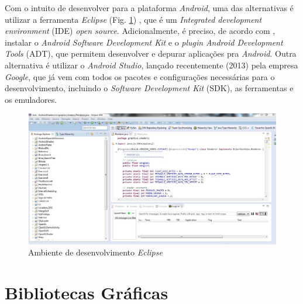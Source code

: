 	Com o intuito de desenvolver para a plataforma \textit{Android}, uma das alternativas é utilizar a ferramenta \textit{Eclipse} (Fig. \ref{eclipse}) , que é um \textit{Integrated development environment} (IDE) \textit{open source}. Adicionalmente, é preciso, de acordo com \cite{androidsdkmanager}, instalar o \textit{Android Software Development Kit} e o	\textit{plugin} \textit{Android Development Tools} (ADT), que permitem desenvolver e depurar aplicações pra \textit{Android}. Outra alternativa é utilizar o \textit{Android Studio}, lançado recentemente (2013) pela empresa \textit{Google}, que já vem com todos os pacotes e configurações necessárias para o desenvolvimento, incluindo o  \textit{Software Development Kit} (SDK), as ferramentas e os emuladores. 

	\begin{figure}[h]
	\centering
		\includegraphics[keepaspectratio=true,scale=0.5]{figuras/eclipse.jpg}
	\caption{Ambiente de desenvolvimento \textit{Eclipse}}
	\label{eclipse}
	\end{figure}

\section{Bibliotecas Gráficas}

